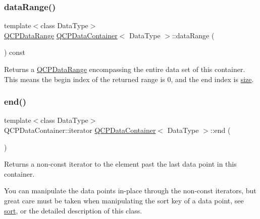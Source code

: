 \subsubsection{\texorpdfstring{data\+Range()}{dataRange()}}
{\footnotesize\ttfamily template$<$class Data\+Type$>$ \\
\hyperlink{classQCPDataRange}{Q\+C\+P\+Data\+Range} \hyperlink{classQCPDataContainer}{Q\+C\+P\+Data\+Container}$<$ Data\+Type $>$\+::data\+Range (\begin{DoxyParamCaption}{ }\end{DoxyParamCaption}) const\hspace{0.3cm}{\ttfamily [inline]}}

Returns a \hyperlink{classQCPDataRange}{Q\+C\+P\+Data\+Range} encompassing the entire data set of this container. This means the begin index of the returned range is 0, and the end index is \hyperlink{classQCPDataContainer_a8e9b262c739672e13472d0d45b720258}{size}. \mbox{\label{classQCPDataContainer_acf66dfad83fe041380f5e0491e7676f2}} 
\subsubsection{\texorpdfstring{end()}{end()}}
{\footnotesize\ttfamily template$<$class Data\+Type$>$ \\
Q\+C\+P\+Data\+Container\+::iterator \hyperlink{classQCPDataContainer}{Q\+C\+P\+Data\+Container}$<$ Data\+Type $>$\+::end (\begin{DoxyParamCaption}{ }\end{DoxyParamCaption})\hspace{0.3cm}{\ttfamily [inline]}}

Returns a non-\/const iterator to the element past the last data point in this container.

You can manipulate the data points in-\/place through the non-\/const iterators, but great care must be taken when manipulating the sort key of a data point, see \hyperlink{classQCPDataContainer_a75da92e33063b63d6da5014683591d45}{sort}, or the detailed description of this class. \mbox{\label{classQCPDataContainer_a2ad8a5399072d99a242d3a6d2d7e278a}} 
